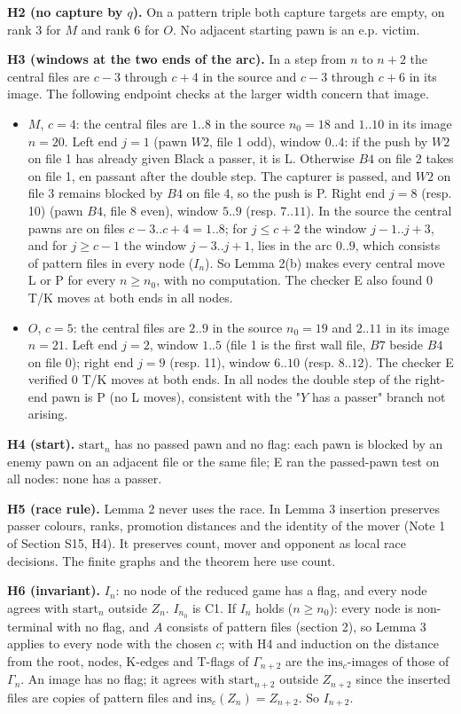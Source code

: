 \textbf{H2 (no capture by $q$).} On a pattern triple both capture targets are empty, on rank 3 for $M$ and rank 6 for $O$. No adjacent starting pawn is an e.p. victim.

\textbf{H3 (windows at the two ends of the arc).} In a step from $n$ to $n+2$ the central files are $c-3$ through $c+4$ in the source and $c-3$ through $c+6$ in its image. The following endpoint checks at the larger width concern that image.

\begin{itemize}
\item $M$, $c=4$: the central files are $1..8$ in the source $n_0=18$ and $1..10$ in its image $n=20$. Left end $j=1$ (pawn $W2$, file 1 odd), window $0..4$: if the push by $W2$ on file 1 has already given Black a passer, it is L. Otherwise $B4$ on file 2 takes on file 1, en passant after the double step. The capturer is passed, and $W2$ on file 3 remains blocked by $B4$ on file 4, so the push is P. Right end $j=8$ (resp. 10) (pawn $B4$, file 8 even), window $5..9$ (resp. $7..11$). In the source the central pawns are on files $c-3..c+4=1..8$; for $j\le c+2$ the window $j-1..j+3$, and for $j\ge c-1$ the window $j-3..j+1$, lies in the arc $0..9$, which consists of pattern files in every node ($I_n$). So Lemma 2(b) makes every central move L or P for every $n\ge n_0$, with no computation. The checker E also found 0 T/K moves at both ends in all nodes.
\item $O$, $c=5$: the central files are $2..9$ in the source $n_0=19$ and $2..11$ in its image $n=21$. Left end $j=2$, window $1..5$ (file 1 is the first wall file, $B7$ beside $B4$ on file 0); right end $j=9$ (resp. 11), window $6..10$ (resp. $8..12$). The checker E verified 0 T/K moves at both ends. In all nodes the double step of the right-end pawn is P (no L moves), consistent with the "$Y$ has a passer" branch not arising.
\end{itemize}
\textbf{H4 (start).} $\mathrm{start}_n$ has no passed pawn and no flag: each pawn is blocked by an enemy pawn on an adjacent file or the same file; E ran the passed-pawn test on all nodes: none has a passer.

\textbf{H5 (race rule).} Lemma 2 never uses the race. In Lemma 3 insertion preserves passer colours, ranks, promotion distances and the identity of the mover (Note 1 of Section S15, H4). It preserves count, mover and opponent as local race decisions. The finite graphs and the theorem here use count.

\textbf{H6 (invariant).} $I_n$: no node of the reduced game has a flag, and every node agrees with $\mathrm{start}_n$ outside $Z_n$. $I_{n_0}$ is C1. If $I_n$ holds ($n\ge n_0$): every node is non-terminal with no flag, and $A$ consists of pattern files (section 2), so Lemma 3 applies to every node with the chosen $c$; with H4 and induction on the distance from the root, nodes, K-edges and T-flags of $\Gamma_{n+2}$ are the $\mathrm{ins}_c$-images of those of $\Gamma_n$. An image has no flag; it agrees with $\mathrm{start}_{n+2}$ outside $Z_{n+2}$ since the inserted files are copies of pattern files and $\mathrm{ins}_c(Z_n)=Z_{n+2}$. So $I_{n+2}$.

